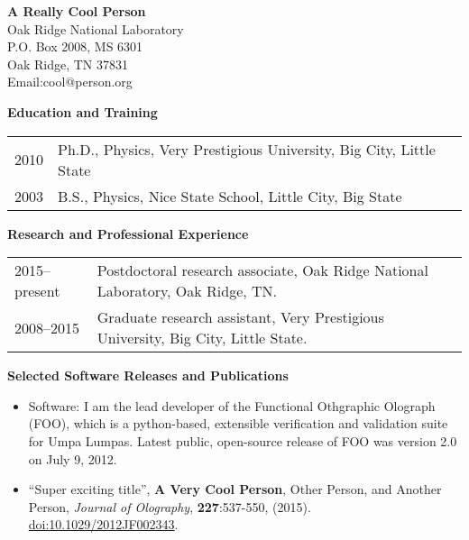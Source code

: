 \newpage

\begin{center}
    {\Large\bf A Really Cool Person} \\[0.25em]
    Oak Ridge National Laboratory \\
    P.O. Box 2008, MS 6301 \\
    Oak Ridge, TN 37831 \\
    Email:cool@person.org
\end{center}

\noindent\textbf{Education and Training}

\vspace{1.5em}
\begin{tabular}{rp{5.6in}}
    2010 & Ph.D., Physics, Very Prestigious University, Big City, Little State \\[0.5em]
    2003 & B.S., Physics, Nice State School, Little City, Big State
\end{tabular}
\vspace{1.5em}
    
\noindent\textbf{Research and Professional Experience}

\vspace{1.5em}
\begin{tabular}{lp{5in}}
    {2015--present} & Postdoctoral research associate, Oak Ridge National Laboratory, Oak Ridge, TN. \\[0.5em]
    {2008--2015}    & Graduate research assistant, Very Prestigious University, Big City, Little State.
\end{tabular}

\vspace{1.5em}

\noindent\textbf{Selected Software Releases and Publications} %

\begin{itemize}

\item[] Software: I am the lead developer of the Functional Othgraphic Olograph (FOO), which is a python-based, extensible verification and validation suite for Umpa Lumpas. Latest public, open-source release of FOO was version 2.0 on July 9, 2012.  



\item[] ``Super exciting title'',
        {\bf A Very Cool Person}, Other Person, and Another Person, 
        {\sl{Journal of Olography}}, {\bf 227}:537-550, (2015).
        \href{http://dx.doi.org/10.1029/2012JF002343}{doi:10.1029/2012JF002343}.
\end{itemize}

